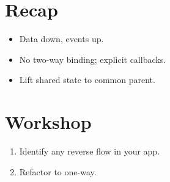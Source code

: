 \section{Recap}

\begin{recap}
\begin{itemize}[leftmargin=*]
  \item Data down, events up.
  \item No two-way binding; explicit callbacks.
  \item Lift shared state to common parent.
\end{itemize}
\end{recap}

\section*{Workshop}

\begin{enumerate}[leftmargin=*]
  \item Identify any reverse flow in your app.
  \item Refactor to one-way.
\end{enumerate}
